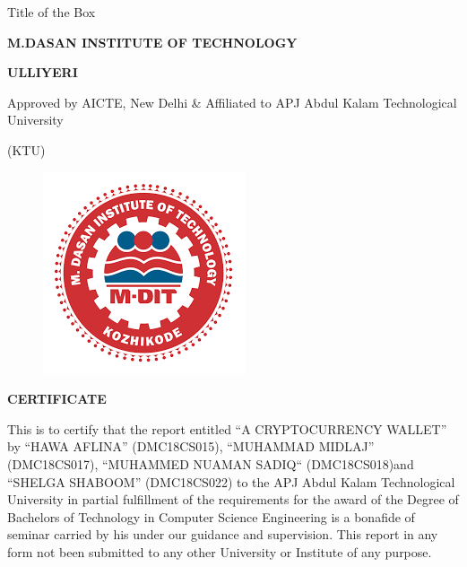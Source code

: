 \documentclass[12pt]{article}
\begin{document}
\begin{boxed}{Title of the Box}
\thispagestyle{empty}

\newpage
\vspace*{1px}
\begin{center}\large\bf{M.DASAN INSTITUTE OF TECHNOLOGY}\end{center}
\begin{center}\large\bf{ULLIYERI} \end{center}
\begin{center}Approved by AICTE, New Delhi \& Affiliated to APJ Abdul Kalam Technological University\end{center}
\begin{center}(KTU)\end{center}

\begin{figure}[H]
\begin{center}
\includegraphics[scale=.4]{MDIT1}
\end{center} 
\end{figure}
\begin{center}\LARGE\bf{CERTIFICATE} \end{center}
\vspace{5mm}
\justifying
This is to certify that the report entitled “A CRYPTOCURRENCY WALLET” by “HAWA AFLINA” (DMC18CS015), “MUHAMMAD MIDLAJ” (DMC18CS017), “MUHAMMED NUAMAN SADIQ“ (DMC18CS018)and “SHELGA SHABOOM” (DMC18CS022) to the APJ Abdul Kalam Technological University in partial fulfillment of the requirements for the award of the Degree of Bachelors of Technology in Computer Science Engineering is a bonafide of seminar carried by his under our guidance and supervision. This report in any form not been submitted to any other University or Institute of any purpose.
\thispagestyle{empty}
\begin{center}
\begin{tabularx}{1\textwidth} { 
  >{\raggedright\arraybackslash}X 
   >{\raggedright\arraybackslash}X 
   >{\raggedright\arraybackslash}X }
 

\end{tabularx}
\end{center}
\end{boxed}
\end{document}
